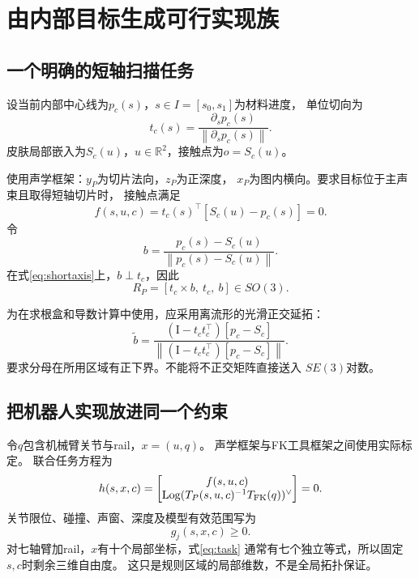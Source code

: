 \documentclass[UTF8,11pt,a4paper,fontset=fandol]{ctexart}
\numberwithin{equation}{section}
\theoremstyle{definition}
\newcommand{\R}{\mathbb R}
\newcommand{\Id}{\mathrm I}
\newcommand{\norm}[1]{\left\lVert#1\right\rVert}
\DeclareMathOperator{\Log}{Log}
\begin{document}
\section{由内部目标生成可行实现族}

\subsection{一个明确的短轴扫描任务}

设当前内部中心线为$p_c(s)$，$s\in I=[s_0,s_1]$为材料进度，
单位切向为
\begin{equation}
 t_c(s)=\frac{\partial_s p_c(s)}
 {\norm{\partial_s p_c(s)}}.
\end{equation}
皮肤局部嵌入为$S_c(u)$，$u\in\R^2$，接触点为$o=S_c(u)$。

使用声学框架：$y_P$为切片法向，$z_P$为正深度，
$x_P$为图内横向。要求目标位于主声束且取得短轴切片时，
接触点满足
\begin{equation}
 \boxed{
 f(s,u,c)=t_c(s)^\top[S_c(u)-p_c(s)]=0.
 }
 \label{eq:shortaxis}
\end{equation}
令
\begin{equation}
 b=\frac{p_c(s)-S_c(u)}
 {\norm{p_c(s)-S_c(u)}}.
\end{equation}
在式\eqref{eq:shortaxis}上，$b\perp t_c$，因此
\begin{equation}
 R_P=[t_c\times b,\ t_c,\ b]\in SO(3).
\end{equation}

为在求根盒和导数计算中使用，应采用离流形的光滑正交延拓：
\begin{equation}
 \widetilde b=
 \frac{(\Id-t_ct_c^\top)[p_c-S_c]}
 {\norm{(\Id-t_ct_c^\top)[p_c-S_c]}}.
\end{equation}
要求分母在所用区域有正下界。不能将不正交矩阵直接送入
$SE(3)$对数。

\subsection{把机器人实现放进同一个约束}

令$q$包含机械臂关节与rail，$x=(u,q)$。
声学框架与FK工具框架之间使用实际标定。
联合任务方程为
\begin{equation}
 h(s,x,c)=
 \begin{bmatrix}
 f(s,u,c)\\
 \Log(T_P(s,u,c)^{-1}T_{\rm FK}(q))^\vee
 \end{bmatrix}=0.
 \label{eq:task}
\end{equation}
关节限位、碰撞、声窗、深度及模型有效范围写为
\begin{equation}
 g_j(s,x,c)\geq0.
\end{equation}
对七轴臂加rail，$x$有十个局部坐标，式\eqref{eq:task}
通常有七个独立等式，所以固定$s,c$时剩余三维自由度。
这只是规则区域的局部维数，不是全局拓扑保证。
\end{document}
